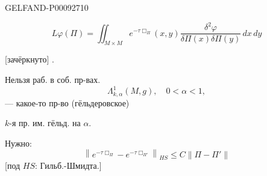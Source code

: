 \begin{GelfandAdjacentEvidence}{GELFAND-P000927}{10}

\begin{equation*}
 L\varphi(\Pi)=\iint_{M\times M} e^{-\tau\Box_\Pi}(x,y)
 \frac{\delta^2\varphi}{\delta\Pi(x)\delta\Pi(y)}\,dx\,dy
 \tag{5}
\end{equation*}

[зачёркнуто] .
\end{GelfandAdjacentEvidence}


Нельзя раб. в соб. пр-вах.
\begin{equation*}
 \Lambda^1_{k,\alpha}(M,g),\quad 0<\alpha<1,
 \tag{6}
\end{equation*}
--- какое-то пр-во (гёльдеровское)

$k$-я пр. им. гёльд. на $\alpha$.

Нужно:
\begin{equation*}
 \left\|e^{-\tau\Box_\Pi}-e^{-\tau\Box_{\Pi'}}\right\|_{HS}
 \le C\|\Pi-\Pi'\|
 \tag{7}
\end{equation*}
[под \(HS\): Гильб.-Шмидта.]


